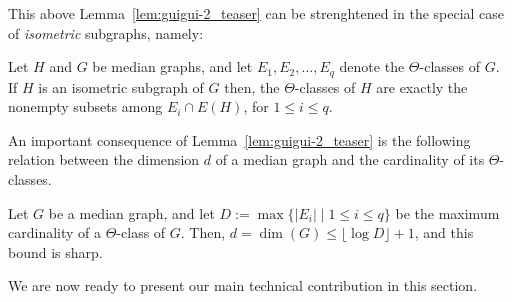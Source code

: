 \documentclass[a4paper,UKenglish,numberwithinsect,cleveref, autoref,anonymous]{lipics-v2021}
\begin{document}
This above Lemma~\ref{lem:guigui-2_teaser} can be strenghtened in the special case of {\em isometric} subgraphs, namely:

\begin{lemma}[\ref{lem:guigui-2bis}]\label{lem:guigui-2bis_teaser}
Let $H$ and $G$ be median graphs, and let $E_1,E_2,\ldots,E_q$ denote the $\Theta$-classes of $G$.
If $H$ is an isometric subgraph of $G$ then, the $\Theta$-classes of $H$ are exactly the nonempty subsets among $E_i \cap E(H)$, for $1 \leq i \leq q$.
\end{lemma}

An important consequence of Lemma~\ref{lem:guigui-2_teaser} is the following relation between the dimension $d$ of a median graph and the cardinality of its $\Theta$-classes.

\begin{lemma}[\ref{lem:guigui-3}]\label{lem:guigui-3_teaser}
Let $G$ be a median graph, and let $D := \max\{ |E_i| \mid 1 \leq i \leq q\}$ be the maximum cardinality of a $\Theta$-class of $G$. Then, $d = \dim(G) \leq \lfloor\log{D}\rfloor + 1$, and this bound is sharp.
\end{lemma}

We are now ready to present our main technical contribution in this section.
\end{document}
